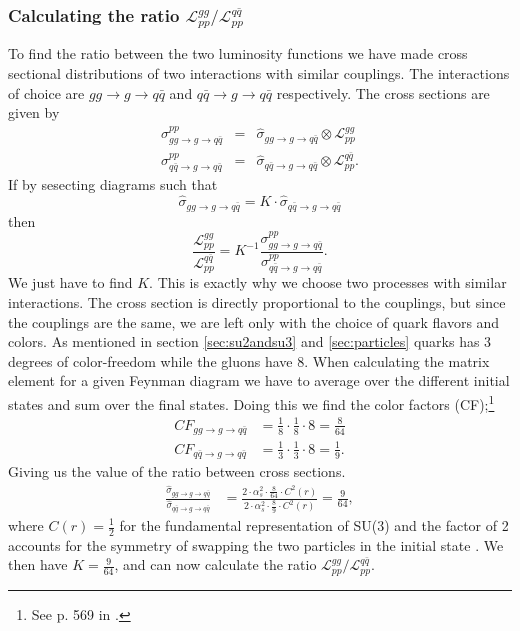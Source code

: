 \subsubsection{Calculating the ratio ${\mathcal{L}_{pp}^{gg}}/{\mathcal{L}_{pp}^{q \bar q}}$}
To find the ratio between the two luminosity functions we have made cross sectional distributions of two interactions with similar couplings. The interactions of choice are  $gg \rightarrow g \rightarrow q \bar q$ and $q \bar q \rightarrow g \rightarrow q \bar q$ respectively. The cross sections are given by  
\begin{eqnarray}
\sigma^{pp}_{gg \rightarrow g \rightarrow q \bar q}&=&\hat \sigma_{gg \rightarrow g \rightarrow q \bar q} \otimes \mathcal{L}_{pp}^{gg} \\
\sigma^{pp}_{q \bar q \rightarrow g \rightarrow q \bar q}&=& \hat \sigma_{q \bar q \rightarrow g \rightarrow q \bar q} \otimes \mathcal{L}_{pp}^{q \bar q}.
\end{eqnarray}
If by sesecting diagrams such that
\begin{equation}
\hat \sigma_{gg \rightarrow g \rightarrow q \bar q} = K \cdot \hat \sigma_{q \bar q \rightarrow g \rightarrow q \bar q} 
\end{equation}
then
\begin{equation}
\frac{\mathcal{L}_{pp}^{gg}}{\mathcal{L}_{pp}^{q \bar q}} = K^{-1} \frac{\sigma^{pp}_{gg \rightarrow g \rightarrow q \bar q}}{\sigma^{pp}_{q \bar q \rightarrow g \rightarrow q \bar q}}. 
\end{equation}
We just have to find $K$. This is exactly why we choose two processes with similar interactions. The cross section is directly proportional to the couplings, but since the couplings are the same, we are left only with the choice of quark flavors and colors. As mentioned in section \ref{sec:su2andsu3} and \ref{sec:particles} quarks has 3 degrees of color-freedom while the gluons have 8. When calculating the matrix element for a given Feynman diagram we have to average over the different initial states and sum over the final states. Doing this we find the color factors (CF);\footnote{See p. 569 in  \cite{peskin1993iqf}.}
\begin{align}
	CF_{gg \rightarrow g \rightarrow q \bar q}&=\frac{1}{8} \cdot \frac{1}{8} \cdot 8=\frac{8}{64}\\
	CF_{q \bar q \rightarrow g \rightarrow q \bar q}&=\frac{1}{3} \cdot \frac{1}{3} \cdot 8=\frac{1}{9}.
\end{align}
Giving us the value of the ratio between cross sections.
\begin{align}
	\frac{\hat \sigma_{gg \rightarrow g \rightarrow q \bar q}}{\hat \sigma_{q \bar q \rightarrow g \rightarrow q \bar q}} &=\frac{2 \cdot \alpha_{s}^2 \cdot \frac{8}{64} \cdot C^{2}(r)}{2 \cdot \alpha_{s}^2 \cdot \frac{8}{9} \cdot C^{2}(r)}=\frac{9}{64},
\end{align}
where $C(r) = \frac{1}{2}$ for the fundamental representation of SU(3) and the factor of 2 accounts for the symmetry of swapping the two particles in the initial state \cite{peskin1993iqf}. We then have $K=\frac{9}{64}$, and can now calculate the ratio ${\mathcal{L}_{pp}^{gg}}/{\mathcal{L}_{pp}^{q \bar q}}$.

